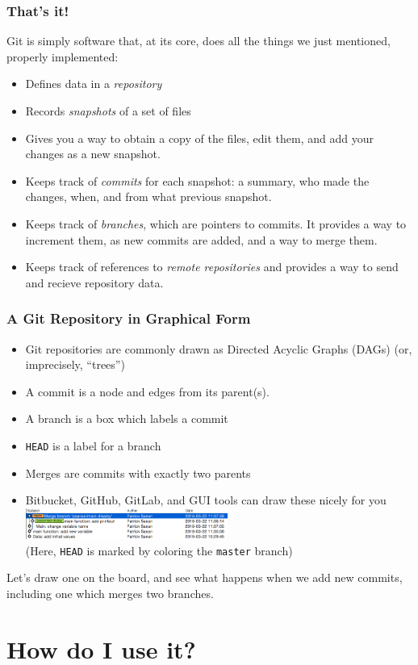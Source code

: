 \begin{frame}[fragile]
\frametitle{That's it!}
Git is simply software that, at its core, does all the things we just mentioned, properly implemented:
\begin{itemize}
\item Defines data in a \emph{repository}
\item Records \emph{snapshots} of a set of files
\item Gives you a way to obtain a copy of the files, edit them, and add your changes as a new snapshot.
\item Keeps track of \emph{commits} for each snapshot: a summary, who made the changes, when, and from what previous snapshot.
\item Keeps track of \emph{branches}, which are pointers to commits. It provides a way to increment them, as new commits are added, and a way to merge them.
\item Keeps track of references to \emph{remote repositories} and provides a way to send and recieve repository data.
\end{itemize}
\end{frame}

\begin{frame}[fragile]
\frametitle{A Git Repository in Graphical Form}
\begin{itemize}
\item Git repositories are commonly drawn as Directed Acyclic Graphs (DAGs) (or, imprecisely, ``trees'')
\item A commit is a node and edges from its parent(s).
\item A branch is a box which labels a commit
\item \texttt{HEAD} is a label for a branch
\item Merges are commits with exactly two parents
\item Bitbucket, GitHub, GitLab, and GUI tools can draw these nicely for you
\includegraphics[width=250px]{gitx.png}\\
(Here, \texttt{HEAD} is marked by coloring the \texttt{master} branch)
\end{itemize}
Let's draw one on the board, and see what happens when we add new commits, including one which merges two branches.
\end{frame}

\section{How do I use it?}

